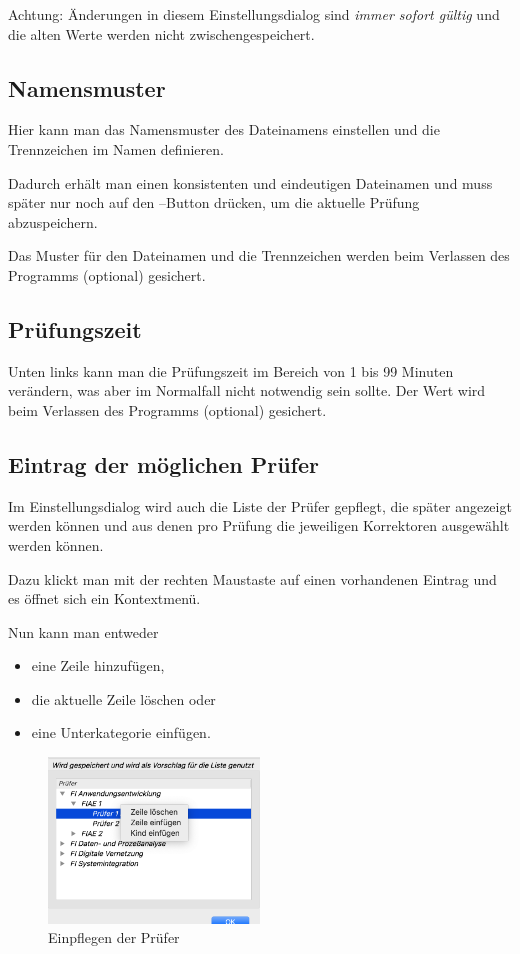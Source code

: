 \documentclass[a4paper,notitlepage,parskip=half]{scrartcl}
\begin{document}
Achtung: Änderungen in diesem Einstellungsdialog sind \emph{immer sofort gültig} und die alten Werte werden nicht zwischengespeichert.

\subsection{Namensmuster}
Hier kann man das Namensmuster des Dateinamens einstellen und die Trennzeichen im Namen definieren.

Dadurch erhält man einen konsistenten und eindeutigen Dateinamen und muss später nur noch auf den --Button drücken, um die aktuelle Prüfung abzuspeichern.

Das Muster für den Dateinamen und die Trennzeichen werden beim Verlassen des Programms (optional) gesichert.

\subsection{Prüfungszeit}
Unten links kann man die Prüfungszeit im Bereich von 1 bis 99 Minuten verändern, was aber im Normalfall nicht notwendig sein sollte. Der Wert wird beim Verlassen des Programms (optional) gesichert.

\subsection{Eintrag der möglichen Prüfer}
Im Einstellungsdialog wird auch die Liste der Prüfer gepflegt, die später angezeigt werden können und aus denen pro Prüfung die jeweiligen Korrektoren ausgewählt werden können.

Dazu klickt man mit der rechten Maustaste auf einen vorhandenen Eintrag und es öffnet sich ein Kontextmenü.

Nun kann man entweder

\begin{itemize}
\item eine Zeile hinzufügen,
\item die aktuelle Zeile löschen oder
\item eine Unterkategorie einfügen. 
\end{itemize}

\begin{figure}[ht]
  \centering
  \includegraphics[width=0.5\textwidth]{Einstellungen2.png}
  \caption{Einpflegen der Prüfer}
  \label{fig:einstellungen2}
\end{figure}
\end{document}
